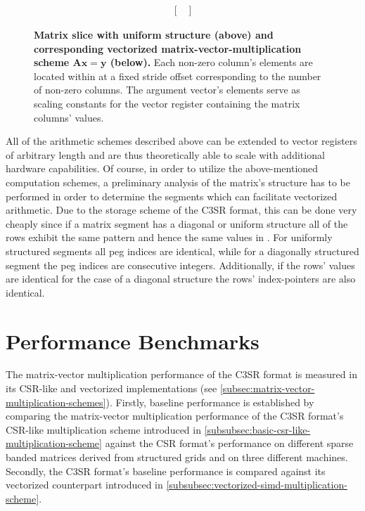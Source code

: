\documentclass{article}
\begin{document}
\begin{figure}[ht]
$$\begin{matrix}
\begin{bmatrix}
                                                                                     \end{bmatrix}
        \end{matrix}
        $$
        \caption[Matrix slice with uniform structure and corresponding vectorized matrix-vector-multiplication scheme.]{\textbf{Matrix slice with uniform structure (above) and corresponding vectorized matrix-vector-multiplication scheme $\bm{Ax=y}$ (below).} Each non-zero column's elements are located within \V at a fixed stride offset corresponding to the number of non-zero columns. The argument vector's elements serve as scaling constants for the vector register containing the matrix columns' values.}
        \label{fig:simd_scheme_uniform}
      \end{figure}

      All of the arithmetic schemes described above can be extended to vector registers of arbitrary length and are thus theoretically able to scale with additional hardware capabilities. Of course, in order to utilize the above-mentioned computation schemes, a preliminary analysis of the matrix's structure has to be performed in order to determine the segments which can facilitate vectorized arithmetic. Due to the storage scheme of the C3SR format, this can be done very cheaply since if a matrix segment has a diagonal or uniform structure all of the rows exhibit the same pattern and hence the same values in \JS. For uniformly structured segments all peg indices are identical, while for a diagonally structured segment the peg indices are consecutive integers. Additionally, if the rows' values are identical for the case of a diagonal structure the rows' index-pointers \VS are also identical.

\section{Performance Benchmarks}

  The matrix-vector multiplication performance of the C3SR format is measured in its CSR-like and vectorized implementations (see \ref{subsec:matrix-vector-multiplication-schemes}). Firstly, baseline performance is established by comparing the matrix-vector multiplication performance of the C3SR format's CSR-like multiplication scheme introduced in \ref{subsubsec:basic-csr-like-multiplication-scheme} against the CSR format's performance on different sparse banded matrices derived from structured grids and on three different machines. Secondly, the C3SR format's baseline performance is compared against its vectorized counterpart introduced in \ref{subsubsec:vectorized-simd-multiplication-scheme}.
\end{document}
